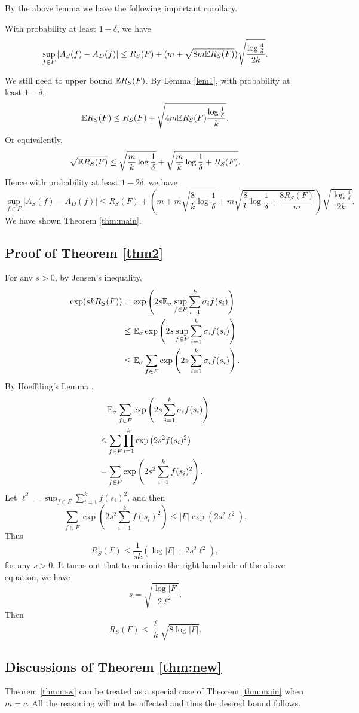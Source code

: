 By the above lemma we have the following important corollary.
\begin{corollary}
With probability at least $1-\delta$, we have
$$\sup_{f\in F}|A_S(f) - A_D(f)| \leq R_S(F) + (m+\sqrt{8m \mathbb{E} R_S(F)})\sqrt{\frac{\log \frac{4}{\delta}}{2k}}.$$
\end{corollary}

We still need to upper bound $\mathbb{E} R_S(F)$. By Lemma \ref{lem1}, with probability at least $1-\delta$,
$$\mathbb{E} R_S(F) \leq R_S(F) + \sqrt{4m\mathbb{E} R_S(F)\frac{\log \frac{1}{\delta}}{k}}.$$
Or equivalently,
$$\sqrt{\mathbb{E} R_S(F)} \leq \sqrt{\frac{m}{k}\log \frac{1}{\delta}} + \sqrt{\frac{m}{k}\log \frac{1}{\delta} + R_S(F)}.$$
Hence with probability at least $1-2\delta$, we have
$$\sup_{f\in F}|A_S(f) - A_D(f)| \leq R_S(F) + \left(m+m\sqrt{\frac{8}{k}\log \frac{1}{\delta}} + m\sqrt{\frac{8}{k}\log \frac{1}{\delta} + \frac{8R_S(F)}{m}}\right)\sqrt{\frac{\log \frac{4}{\delta}}{2k}}.$$
We have shown Theorem \ref{thm:main}.


\subsection{Proof of Theorem \ref{thm2}}
For any $s>0$, by Jensen's inequality,
$$\begin{aligned}
\exp(skR_S(F)) & = \exp\left(2s\mathbb{E}_\sigma \sup_{f\in F} \sum_{i=1}^k \sigma_i f(s_i)\right) \\
&\leq \mathbb{E}_\sigma \exp\left(2s \sup_{f\in F} \sum_{i=1}^k \sigma_i f(s_i)\right) \\
&\leq \mathbb{E}_\sigma \sum_{f\in F} \exp\left(2s\sum_{i=1}^k \sigma_i f(s_i)\right).
\end{aligned}$$
By Hoeffding's Lemma \cite{H63},
$$\begin{aligned}
&\mathbb{E}_\sigma \sum_{f\in F} \exp\left(2s\sum_{i=1}^k \sigma_i f(s_i)\right) \\
\leq & \sum_{f\in F}\prod_{i=1}^k \exp\left(2s^2f(s_i)^2\right) \\
=& \sum_{f\in F} \exp\left(2s^2\sum_{i=1}^k f(s_i)^2\right).
\end{aligned}$$
Let $\ell^2 = \sup_{f\in F}\sum_{i=1}^k f(s_i)^2$, and then
$$\sum_{f\in F} \exp\left(2s^2\sum_{i=1}^k f(s_i)^2\right) \leq |F| \exp\left(2s^2\ell^2\right).$$
Thus
$$R_S(F) \leq \frac{1}{sk}(\log|F| + 2s^2\ell^2),$$
for any $s>0$. It turns out that to minimize the right hand side of the above equation, we have
$$s = \sqrt{\frac{\log|F|}{2\ell^2}}.$$
Then
$$R_S(F) \leq \frac{\ell}{k}\sqrt{8\log |F|}.$$ 


\subsection{Discussions of Theorem \ref{thm:new}}
Theorem \ref{thm:new} can be treated as a special case of Theorem \ref{thm:main} when $m=c$. All the reasoning will not be affected and thus the desired bound follows.